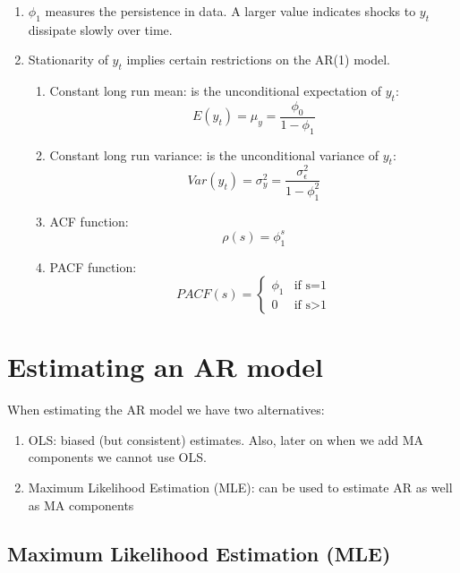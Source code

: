 \documentclass[]{book}
\providecommand{\tightlist}{%
  \setlength{\itemsep}{0pt}\setlength{\parskip}{0pt}}
\theoremstyle{definition}
\theoremstyle{definition}
\theoremstyle{definition}
\theoremstyle{remark}
\begin{document}
\begin{enumerate}
\def\labelenumi{\arabic{enumi}.}
\item
  \(\displaystyle \phi_1\) measures the persistence in data. A larger value indicates shocks to \(y_t\) dissipate slowly over time.
\item
  Stationarity of \(y_t\) implies certain restrictions on the AR(1) model.

  \begin{enumerate}
  \def\labelenumii{\roman{enumii}.}
  \tightlist
  \item
    Constant long run mean: is the unconditional expectation of \(y_t\):
    \[ E(y_t) = \mu_y= \frac{\phi_0}{1-\phi_1}  \]
  \item
    Constant long run variance: is the unconditional variance of \(y_t\):
    \[ Var(y_t)=\sigma^2_y= \frac{\sigma^2_\epsilon}{1-\phi_1^2}\]
  \item
    ACF function:
    \[ \rho(s) = \phi_1^s\]
  \item
    PACF function:
    \begin{equation*}
      PACF(s) =
      \begin{cases}
    \phi_1 & \text{if  s=1}\\
    0 & \text{if s>1}
      \end{cases}
     \end{equation*}
  \end{enumerate}
\end{enumerate}

\hypertarget{estimating-an-ar-model}{%
\section{Estimating an AR model}\label{estimating-an-ar-model}}

When estimating the AR model we have two alternatives:

\begin{enumerate}
\def\labelenumi{\arabic{enumi}.}
\item
  OLS: biased (but consistent) estimates. Also, later on when we add MA components we cannot use OLS.
\item
  Maximum Likelihood Estimation (MLE): can be used to estimate AR as well as MA components
\end{enumerate}

\hypertarget{maximum-likelihood-estimation-mle}{%
\subsection{Maximum Likelihood Estimation (MLE)}\label{maximum-likelihood-estimation-mle}}
\end{document}
